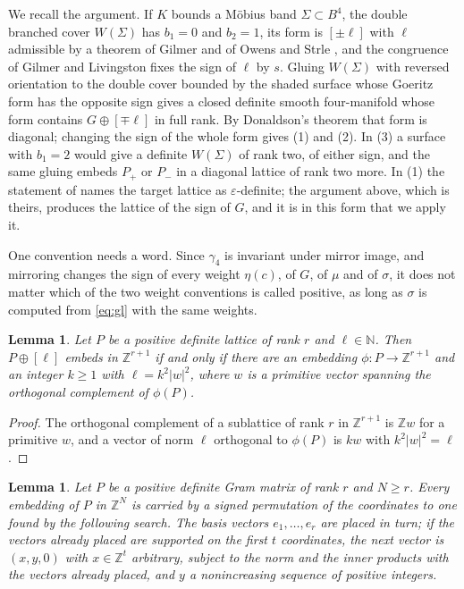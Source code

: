 \documentclass[11pt]{amsart}
\newtheorem{lemma}[theorem]{Lemma}
\theoremstyle{definition}
\theoremstyle{remark}
\begin{document}
We recall the argument. If $K$ bounds a M\"obius band $\Sigma\subset B^4$, the double
branched cover $W(\Sigma)$ has $b_1=0$ \cite{JK} and $b_2=1$, its form is $[\pm\ell]$ with
$\ell$ admissible by a theorem of Gilmer and of Owens and Strle \cite[Corollary 2.8]{JK}, and the congruence of
Gilmer and Livingston \cite{GiL} fixes the sign of $\ell$ by $s$. Gluing $W(\Sigma)$ with
reversed orientation to the double cover bounded by the shaded surface whose Goeritz form has
the opposite sign gives a closed definite smooth four-manifold whose form contains
$G\oplus[\mp\ell]$ in full rank. By Donaldson's theorem \cite{Do} that form is diagonal;
changing the sign of the whole form gives (1) and (2). In (3) a surface with $b_1=2$ would
give a definite $W(\Sigma)$ of rank two, of either sign, and the same gluing embeds $P_+$ or
$P_-$ in a diagonal lattice of rank two more. In (1) the statement of \cite{JK} names the
target lattice as $\varepsilon$-definite; the argument above, which is theirs, produces the
lattice of the sign of $G$, and it is in this form that we apply it.

One convention needs a word. Since $\gamma_4$ is invariant under mirror image,
and mirroring changes the sign of every weight $\eta(c)$, of $G$, of $\mu$ and of $\sigma$,
it does not matter which of the two weight conventions is called positive, as long as
$\sigma$ is computed from \eqref{eq:gl} with the same weights.

\begin{lemma}\label{lem:complement}
Let $P$ be a positive definite lattice of rank $r$ and $\ell\in\mathbb N$. Then
$P\oplus[\ell]$ embeds in $\mathbb Z^{r+1}$ if and only if there are an embedding
$\phi\colon P\to\mathbb Z^{r+1}$ and an integer $k\ge1$ with $\ell=k^2|w|^2$, where $w$ is a
primitive vector spanning the orthogonal complement of $\phi(P)$.
\end{lemma}

\begin{proof}
The orthogonal complement of a sublattice of rank $r$ in $\mathbb Z^{r+1}$ is $\mathbb Z w$
for a primitive $w$, and a vector of norm $\ell$ orthogonal to $\phi(P)$ is $kw$ with
$k^2|w|^2=\ell$.
\end{proof}

\begin{lemma}\label{lem:search}
Let $P$ be a positive definite Gram matrix of rank $r$ and $N\ge r$. Every embedding of $P$
in $\mathbb Z^N$ is carried by a signed permutation of the coordinates to one found by the
following search. The basis vectors $e_1,\dots,e_r$ are placed in turn; if the vectors
already placed are supported on the first $t$ coordinates, the next vector is
$(x,y,0)$ with $x\in\mathbb Z^t$ arbitrary, subject to the norm and the inner products with
the vectors already placed, and $y$ a nonincreasing sequence of positive integers.
\end{lemma}
\end{document}
